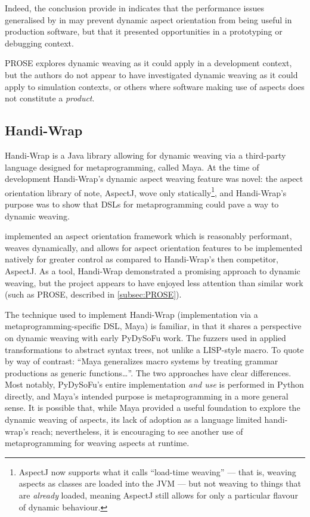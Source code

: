 Indeed, the conclusion \citeauthor{popovici2003JITaspects} provide in
\cite{popovici2003JITaspects} indicates that the performance issues generalised
by \citeauthor{dynamicAOchitchyan} in \cite{dynamicAOchitchyan} may prevent
dynamic aspect orientation from being useful in production software, but that
it presented opportunities in a prototyping or debugging context.

PROSE explores dynamic weaving as it could apply in a development context, but
the authors do not appear to have investigated dynamic weaving as it could apply
to simulation contexts, or others where software making use of aspects does not
constitute a \emph{product}.


\subsection{Handi-Wrap}
Handi-Wrap\cite{Baker_2002} is a Java library allowing for dynamic weaving via a
third-party language designed for metaprogramming, called Maya. At the time of
development Handi-Wrap's dynamic aspect weaving feature was novel: the aspect
orientation library of note, AspectJ, wove only statically\footnote{AspectJ now
supports what it calls ``load-time weaving'' --- that is, weaving aspects as
classes are loaded into the JVM --- but not weaving to things that are
\emph{already} loaded, meaning AspectJ still allows for only a particular
flavour of dynamic behaviour.}, and Handi-Wrap's purpose was to show that DSLs
for metaprogramming could pave a way to dynamic weaving.

\citeauthor{Baker_2002} implemented an aspect orientation framework which is
reasonably performant, weaves dynamically, and allows for aspect orientation
features to be implemented natively for greater control as compared to
Handi-Wrap's then competitor, AspectJ. As a tool, Handi-Wrap demonstrated a
promising approach to dynamic weaving, but the project appears to have enjoyed
less attention than similar work (such as PROSE, described in
\cref{subsec:PROSE}).

The technique used to implement Handi-Wrap (implementation via a
metaprogramming-specific DSL, Maya) is familiar, in that it shares a perspective
on dynamic weaving with early PyDySoFu work. The fuzzers used in
\cite{wallis2018caise} applied transformations to abstract syntax trees, not
unlike a LISP-style macro. To quote \cite{baker2002maya} by way of contrast:
``{\ttfamily{}Maya generalizes macro systems by treating grammar productions as
generic functions\ldots{}}''. The two
approaches have clear differences. Most notably, PyDySoFu's entire
implementation \emph{and use} is performed in Python directly, and Maya's
intended purpose is metaprogramming in a more general sense. It is possible
that, while Maya provided a useful foundation to explore the dynamic weaving of
aspects, its lack of adoption as a language limited handi-wrap's reach;
nevertheless, it is encouraging to see another use of metaprogramming for
weaving aspects at runtime.


